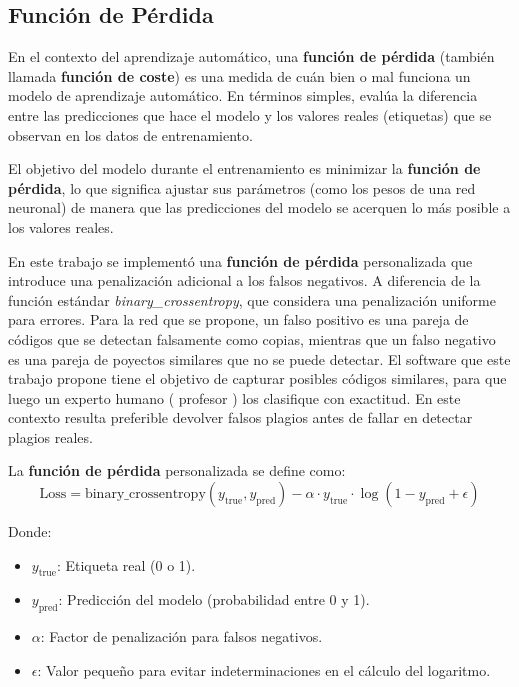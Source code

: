 \begin{itemize}
\subsection{Función de Pérdida} \label{sec:func}

En el contexto del aprendizaje automático, una \textbf{función de pérdida}  (también llamada \textbf{función de coste}) es una medida de cuán bien o mal funciona un modelo de aprendizaje automático. En términos simples, evalúa la diferencia entre las predicciones que hace el modelo y los valores reales (etiquetas) que se observan en los datos de entrenamiento.

El objetivo del modelo durante el entrenamiento es minimizar la \textbf{función de pérdida}, lo que significa ajustar sus parámetros (como los pesos de una red neuronal) de manera que las predicciones del modelo se acerquen lo más posible a los valores reales.

En este trabajo se implementó una \textbf{función de pérdida} personalizada que introduce una penalización adicional a los falsos negativos. A diferencia de la función estándar \textit{binary\_crossentropy}, que considera una penalización uniforme para errores. Para la red que se propone, un falso positivo es una pareja de códigos que se detectan falsamente como copias, mientras que un falso negativo es una pareja de poyectos similares que no se puede detectar. El software que este trabajo propone tiene el objetivo de capturar posibles códigos similares, para que luego un experto humano ( profesor ) los clasifique con exactitud. En este contexto resulta preferible devolver falsos plagios antes de fallar en detectar plagios reales.

La \textbf{función de pérdida} personalizada se define como:
\[
\text{Loss} = \text{binary\_crossentropy}(y_{\text{true}}, y_{\text{pred}}) - \alpha \cdot y_{\text{true}} \cdot \log(1 - y_{\text{pred}} + \epsilon)
\]

Donde:
\begin{itemize}
    \item \( y_{\text{true}} \): Etiqueta real (0 o 1).
    \item \( y_{\text{pred}} \): Predicción del modelo (probabilidad entre 0 y 1).
    \item \( \alpha \): Factor de penalización para falsos negativos.
    \item \( \epsilon \): Valor pequeño para evitar indeterminaciones en el cálculo del logaritmo.
\end{itemize}


\end{itemize}
